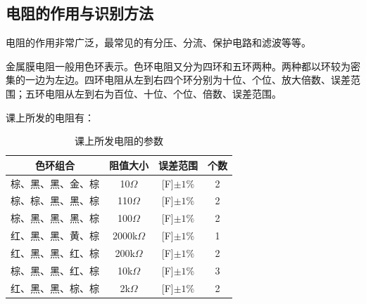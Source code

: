 \documentclass{ctexart}
\begin{document}
\subsection{电阻的作用与识别方法}
电阻的作用非常广泛，最常见的有分压、分流、保护电路和滤波等等。

金属膜电阻一般用色环表示。色环电阻又分为四环和五环两种。两种都以环较为密集的一边为左边。四环电阻从左到右四个环分别为十位、个位、放大倍数、误差范围；五环电阻从左到右为百位、十位、个位、倍数、误差范围。

课上所发的电阻有：
\begin{table}[!ht]
    \centering
    \caption{课上所发电阻的参数}
\begin{tabular}{cccc}
    \toprule[1.5pt]
    色环组合 & 阻值大小 & 误差范围 & 个数\\
    \midrule
    棕、黑、黑、金、棕  &10$\Omega$ &[F]$\pm1\%$ &2\\
    棕、棕、黑、黑、棕  &110$\Omega$  &[F]$\pm1\%$  & 2\\
    棕、黑、黑、黑、棕  &100$\Omega$ &[F]$\pm1\%$ &2\\
    红、黑、黑、黄、棕  &2000k$\Omega$ &[F]$\pm1\%$  &1\\
    红、黑、黑、红、棕  &200k$\Omega$  &[F]$\pm1\%$ & 2\\
    棕、黑、黑、红、棕  &10k$\Omega$ &[F]$\pm1\%$&3\\
    红、黑、黑、棕、棕  &2k$\Omega$&[F]$\pm1\%$ &2\\
    \bottomrule
    \end{tabular}
\end{table}
\end{document}
